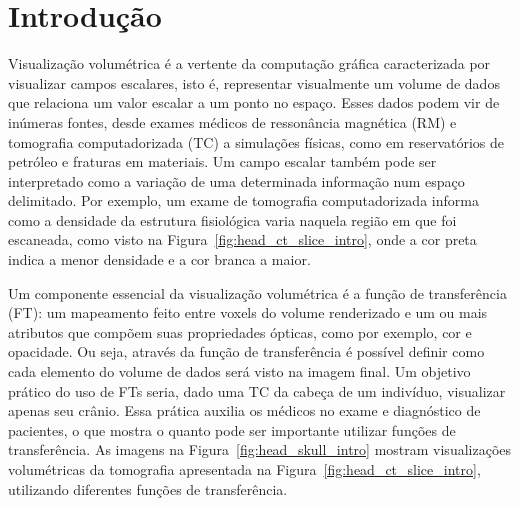 
\chapter{Introdução}
\label{intro}
	Visualização volumétrica é a vertente da computação gráfica caracterizada por visualizar campos escalares, isto é, representar visualmente um volume de dados que relaciona um valor escalar a um ponto no espaço. Esses dados podem vir de inúmeras fontes, desde exames médicos de ressonância magnética (RM) e tomografia computadorizada (TC) a simulações físicas, como em reservatórios de petróleo e fraturas em materiais. Um campo escalar também pode ser interpretado como a variação de uma determinada informação num espaço delimitado. Por exemplo, um exame de tomografia computadorizada informa como a densidade da estrutura fisiológica varia naquela região em que foi escaneada, como visto na Figura~\ref{fig:head_ct_slice_intro}, onde a cor preta indica a menor densidade e a cor branca a maior.
    
    Um componente essencial da visualização volumétrica é a função de transferência (FT): um mapeamento feito entre voxels do volume renderizado e um ou mais atributos que compõem suas propriedades ópticas, como por exemplo, cor e opacidade. Ou seja, através da função de transferência é possível definir como cada elemento do volume de dados será visto na imagem final. Um objetivo prático do uso de FTs seria, dado uma TC da cabeça de um indivíduo, visualizar apenas seu crânio. Essa prática auxilia os médicos no exame e diagnóstico de pacientes, o que mostra o quanto pode ser importante utilizar funções de transferência. As imagens na Figura~\ref{fig:head_skull_intro} mostram visualizações volumétricas da tomografia apresentada na Figura~\ref{fig:head_ct_slice_intro}, utilizando diferentes funções de transferência.
    
